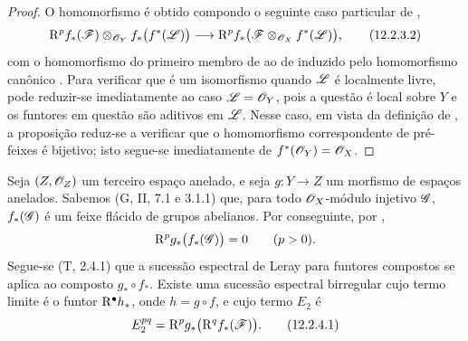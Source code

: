 \begin{proof}
O homomorfismo  é obtido compondo o
seguinte caso particular de ,
\[
  \RR^p f_*(\sh{F})
    \otimes_{\sh{O}_Y}f_*\bigl(f^*(\sh{L})\bigr)
  \longrightarrow
  \RR^p f_*
    \bigl(\sh{F}\otimes_{\sh{O}_X}f^*(\sh{L})\bigr),
  \tag{12.2.3.2}
  \label{0.12.2.3.2}
\]
com o homomorfismo do primeiro membro de
 ao de  induzido pelo
homomorfismo canônico .
Para verificar que  é um isomorfismo quando $\mathscr{L}$ é
localmente livre, pode reduzir-se imediatamente ao caso
$\mathscr{L}=\mathscr{O}_Y$, pois a questão é local sobre $Y$ e os
funtores em questão são aditivos em $\mathscr{L}$.
Nesse caso, em vista da definição de , a
proposição reduz-se a verificar que o homomorfismo correspondente
de pré-feixes é bijetivo; isto segue-se imediatamente de
$f^*(\mathscr{O}_Y)=\mathscr{O}_X$.
\end{proof}

\begin{env}[12.2.4]
\label{0.12.2.4}
Seja $(Z,\mathscr{O}_Z)$ um terceiro espaço anelado, e seja
$g:Y\to Z$ um morfismo de espaços anelados.
Sabemos (G, II, 7.1 e 3.1.1) que, para todo
$\mathscr{O}_X$-módulo injetivo $\mathscr{G}$, $f_*(\mathscr{G})$ é um feixe flácido de
grupos abelianos.  Por conseguinte, por ,
\[
  \mathrm{R}^p g_*\bigl(f_*(\mathscr{G})\bigr)=0
  \qquad(p>0).
\]
Segue-se (T, 2.4.1) que a sucessão espectral de Leray para funtores
compostos se aplica ao composto $g_*\circ f_*$.  Existe uma
sucessão espectral birregular cujo termo limite é o funtor
$\mathrm{R}^\bullet h_*$, onde $h=g\circ f$, e cujo termo $E_2$ é
\[
  E_2^{pq}=\RR^p g_*\bigl(\RR^q f_*(\sh{F})\bigr).
  \tag{12.2.4.1}
  \label{0.12.2.4.1}
\]
\end{env}

